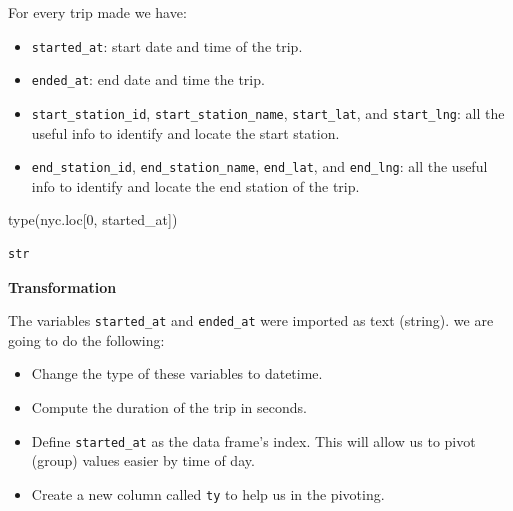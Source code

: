 \documentclass[
  letterpaper,
  DIV=11,
  numbers=noendperiod]{scrreprt}
\newenvironment{Shaded}{\begin{snugshade}}{\end{snugshade}}
\newcommand{\BuiltInTok}[1]{\textcolor[rgb]{0.00,0.23,0.31}{#1}}
\newcommand{\DecValTok}[1]{\textcolor[rgb]{0.68,0.00,0.00}{#1}}
\newcommand{\NormalTok}[1]{\textcolor[rgb]{0.00,0.23,0.31}{#1}}
\newcommand{\StringTok}[1]{\textcolor[rgb]{0.13,0.47,0.30}{#1}}
\providecommand{\tightlist}{%
  \setlength{\itemsep}{0pt}\setlength{\parskip}{0pt}}\usepackage{longtable,booktabs,array}
\begin{document}
For every trip made we have:

\begin{itemize}
\tightlist
\item
  \texttt{started\_at}: start date and time of the trip.
\item
  \texttt{ended\_at}: end date and time the trip.
\item
  \texttt{start\_station\_id}, \texttt{start\_station\_name},
  \texttt{start\_lat}, and \texttt{start\_lng}: all the useful info to
  identify and locate the start station.
\item
  \texttt{end\_station\_id}, \texttt{end\_station\_name},
  \texttt{end\_lat}, and \texttt{end\_lng}: all the useful info to
  identify and locate the end station of the trip.
\end{itemize}

\begin{Shaded}
\begin{Highlighting}[]
\BuiltInTok{type}\NormalTok{(nyc.loc[}\DecValTok{0}\NormalTok{, }\StringTok{\textquotesingle{}started\_at\textquotesingle{}}\NormalTok{])}
\end{Highlighting}
\end{Shaded}

\begin{verbatim}
str
\end{verbatim}

\textbf{Transformation}

The variables \texttt{started\_at} and \texttt{ended\_at} were imported
as text (string). we are going to do the following:

\begin{itemize}
\tightlist
\item
  Change the type of these variables to datetime.
\item
  Compute the duration of the trip in seconds.
\item
  Define \texttt{started\_at} as the data frame's index. This will allow
  us to pivot (group) values easier by time of day.
\item
  Create a new column called \texttt{ty} to help us in the pivoting.
\end{itemize}
\end{document}
